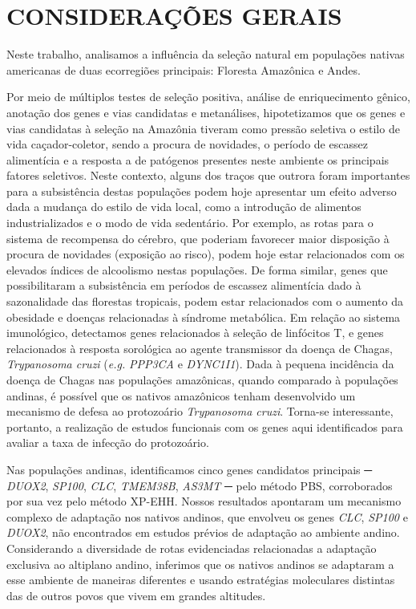\chapter{CONSIDERAÇÕES GERAIS}
\label{cap:consideracoes_gerais}

Neste trabalho, analisamos a influência da seleção natural em populações nativas americanas de duas ecorregiões principais: Floresta Amazônica e Andes.

Por meio de múltiplos testes de seleção positiva, análise de enriquecimento gênico, anotação dos genes e vias candidatas e metanálises, hipotetizamos que os genes e vias candidatas à seleção na Amazônia tiveram como pressão seletiva o estilo de vida caçador-coletor, sendo a procura de novidades, o período de escassez alimentícia e a resposta a de patógenos presentes neste ambiente os principais fatores seletivos. Neste contexto, alguns dos traços que outrora foram importantes para a subsistência destas populações podem hoje apresentar um efeito adverso dada a mudança do estilo de vida local, como a introdução de alimentos industrializados e o modo de vida sedentário. Por exemplo, as rotas para o sistema de recompensa do cérebro, que poderiam favorecer maior disposição à procura de novidades (exposição ao risco), podem hoje estar relacionados com os elevados índices de alcoolismo nestas populações. De forma similar, genes que possibilitaram a subsistência em períodos de escassez alimentícia dado à sazonalidade das florestas tropicais, podem estar relacionados com o aumento da obesidade e doenças relacionadas à síndrome metabólica. Em relação ao sistema imunológico, detectamos genes relacionados à seleção de linfócitos T, e genes relacionados à resposta sorológica ao agente transmissor da doença de Chagas, \textit{Trypanosoma cruzi} (\emph{e.g.} \textsl{PPP3CA} e \textsl{DYNC1I1}). Dada à pequena incidência da doença de Chagas nas populações amazônicas, quando comparado à populações andinas, é possível que os nativos amazônicos tenham desenvolvido um mecanismo de defesa ao protozoário \textit{Trypanosoma cruzi}. Torna-se interessante, portanto, a realização de estudos funcionais com os genes aqui identificados para avaliar a taxa de infecção do protozoário.

Nas populações andinas, identificamos cinco genes candidatos principais ─ \textsl{DUOX2}, \textsl{SP100}, \textsl{CLC}, \textsl{TMEM38B}, \textsl{AS3MT}  ─ pelo método PBS, corroborados por sua vez pelo método XP-EHH. Nossos resultados apontaram um mecanismo complexo de adaptação nos nativos andinos, que envolveu os genes \textsl{CLC}, \textsl{SP100} e \textsl{DUOX2}, não encontrados em estudos prévios de adaptação ao ambiente andino. Considerando a diversidade de rotas evidenciadas relacionadas a adaptação exclusiva ao altiplano andino, inferimos que os nativos andinos se adaptaram a esse ambiente de maneiras diferentes e usando estratégias moleculares distintas das de outros povos que vivem em grandes altitudes.

